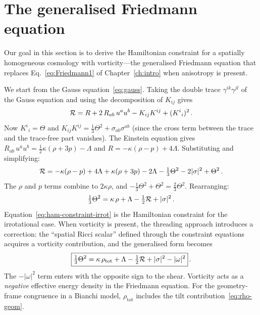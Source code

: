 \section{The generalised Friedmann equation}
\label{sec:gen-friedmann}

Our goal in this section is to derive the Hamiltonian constraint
for a spatially homogeneous cosmology with vorticity---the
generalised Friedmann equation that replaces
Eq.~\eqref{eq:Friedmann1} of Chapter~\ref{ch:intro} when
anisotropy is present.

We start from the Gauss equation~\eqref{eq:gauss}.  Taking the
double trace $\gamma^{ik}\gamma^{jl}$ of the Gauss equation and
using the decomposition of $K_{ij}$ gives
\begin{equation}\label{eq:gauss-trace}
\mathcal{R} = R + 2\,R_{ab}\,u^a u^b
  - K_{ij}K^{ij} + (K^i{}_i)^2\,.
\end{equation}
Now $K^i{}_i = \Theta$ and
$K_{ij}K^{ij} = \frac{1}{3}\Theta^2 + \sigma_{ab}\sigma^{ab}$
(since the cross term between the trace and the trace-free
part vanishes).  The Einstein equation gives
$R_{ab}\,u^a u^b = \frac{1}{2}\kappa(\rho + 3p) - \Lambda$
and $R = -\kappa(\rho - p) + 4\Lambda$.  Substituting and
simplifying:
\begin{equation}
\mathcal{R} = -\kappa(\rho - p) + 4\Lambda
  + \kappa(\rho + 3p) - 2\Lambda
  - \tfrac{1}{3}\Theta^2 - 2|\sigma|^2 + \Theta^2\,.
\end{equation}
The $\rho$ and $p$ terms combine to $2\kappa\rho$, and
$-\frac{1}{3}\Theta^2 + \Theta^2 = \frac{2}{3}\Theta^2$.
Rearranging:
\begin{equation}\label{eq:ham-constraint-irrot}
\tfrac{1}{3}\Theta^2
= \kappa\,\rho + \Lambda
  - \tfrac{1}{2}\mathcal{R}
  + |\sigma|^2\,.
\end{equation}
Equation~\eqref{eq:ham-constraint-irrot} is the Hamiltonian constraint for the irrotational case.
When vorticity is present, the threading approach introduces a
correction: the ``spatial Ricci scalar'' defined through the
constraint equations acquires a vorticity contribution, and the
generalised form becomes~\cite{EllisVanElst1999,EllisMaartens2012}
\begin{equation}\label{eq:ham-constraint}
\boxed{
\tfrac{1}{3}\Theta^2
= \kappa\,\rho_{\mathrm{tot}} + \Lambda
  - \tfrac{1}{2}\mathcal{R}
  + |\sigma|^2 - |\omega|^2
}\,.
\end{equation}
The $-|\omega|^2$ term enters with the opposite sign to the
shear.  Vorticity acts as a \emph{negative} effective energy
density in the Friedmann equation.  For the geometry-frame
congruence in a Bianchi model, $\rho_{\mathrm{tot}}$ includes
the tilt contribution~\eqref{eq:rho-geom}.


